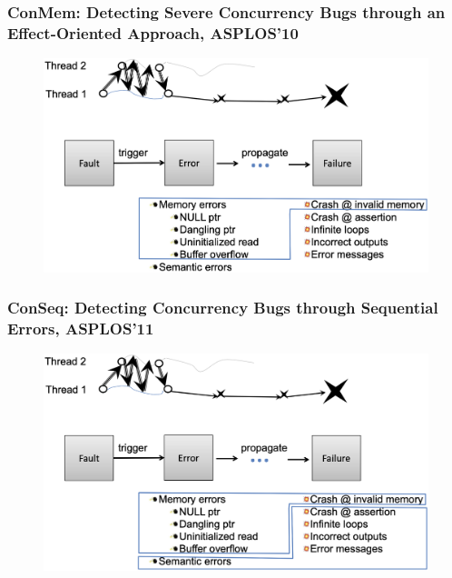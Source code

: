 % 
% 
% 
% 
% 
\begin{frame}[fragile]
    \frametitle{ConMem: Detecting Severe Concurrency Bugs through an Effect-Oriented Approach, ASPLOS’10}
    \begin{figure}
    \includegraphics[width=0.4\linewidth]{figs/ConMem.png}
    \end{figure}
\end{frame}
% 
% 
% 
\begin{frame}[fragile]
    \frametitle{ConSeq: Detecting Concurrency Bugs through Sequential Errors, ASPLOS’11}
    \begin{figure}
    \includegraphics[width=0.4\linewidth]{figs/ConSeq.png}
    \end{figure}
\end{frame}
% 

